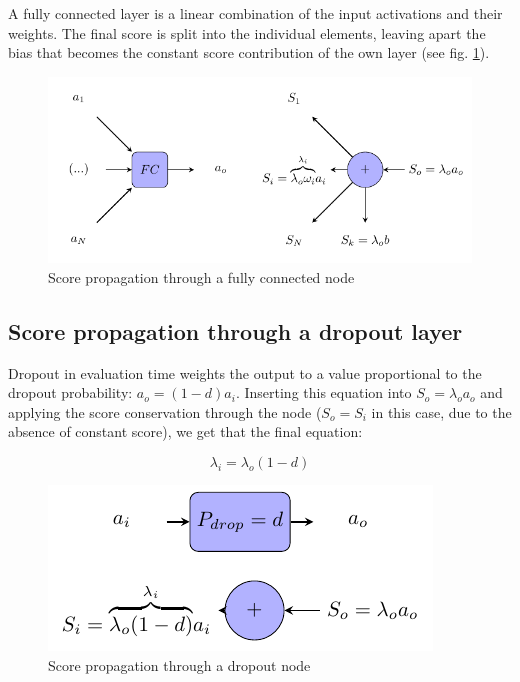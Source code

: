 \documentclass[review]{elsarticle}
\theoremstyle{definition} %
\theoremstyle{remark}
\begin{document}
A fully connected layer is a linear combination of the input activations and their weights. The final score is split into the individual elements, leaving apart the bias that becomes the constant score contribution of the own layer (see fig. \ref{fig:score_fc}).

\begin{figure}[!ht]
	\centering
	\includegraphics{./figures/score_fc.pdf}
	\caption{Score propagation through a fully connected node}
	\label{fig:score_fc}
\end{figure}

\subsection{Score propagation through a dropout layer}

Dropout in evaluation time weights the output to a value proportional to the dropout probability: $a_o = (1-d)a_i$. Inserting this equation into $S_o = \lambda_o a_o$ and applying the score conservation through the node ($S_o = S_i$ in this case, due to the absence of constant score), we get that the final equation:

\begin{equation}
 \lambda_i = \lambda_o (1-d)
\end{equation}

\begin{figure}[!ht]
	\centering
	\includegraphics{./figures/score_dropout.pdf}
	\caption{Score propagation through a dropout node}
	\label{fig:score_dropout}
\end{figure}
\end{document}
